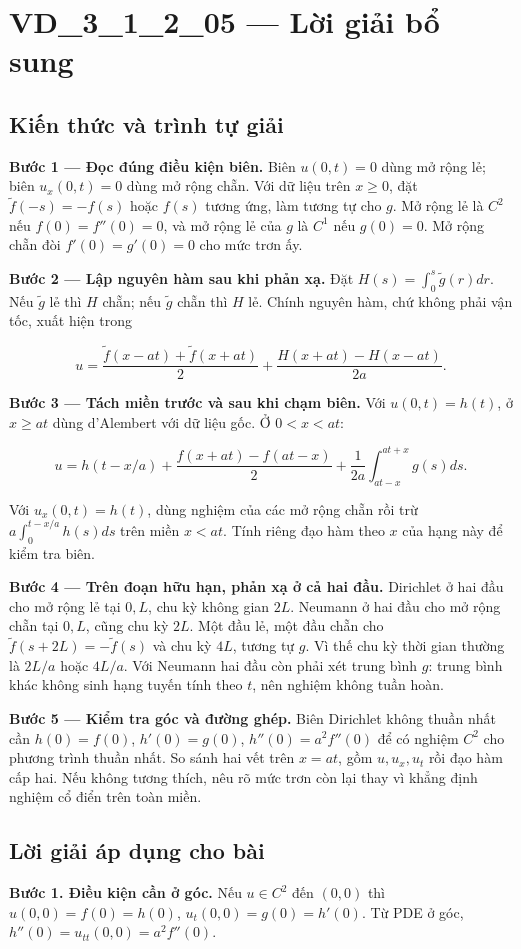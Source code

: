\documentclass[10pt,a4paper]{article}
\begin{document}
\section*{VD\_3\_1\_2\_05 — Lời giải bổ sung}
\subsection*{Kiến thức và trình tự giải}
\textbf{Bước 1 — Đọc đúng điều kiện biên.} Biên $u(0,t)=0$ dùng mở rộng lẻ; biên $u_x(0,t)=0$ dùng mở rộng chẵn. Với dữ liệu trên $x\ge0$, đặt $\widetilde f(-s)=-f(s)$ hoặc $f(s)$ tương ứng, làm tương tự cho $g$. Mở rộng lẻ là $C^2$ nếu $f(0)=f''(0)=0$, và mở rộng lẻ của $g$ là $C^1$ nếu $g(0)=0$. Mở rộng chẵn đòi $f'(0)=g'(0)=0$ cho mức trơn ấy.

\textbf{Bước 2 — Lập nguyên hàm sau khi phản xạ.} Đặt $H(s)=\int_0^s\widetilde g(r)dr$. Nếu $\widetilde g$ lẻ thì $H$ chẵn; nếu $\widetilde g$ chẵn thì $H$ lẻ. Chính nguyên hàm, chứ không phải vận tốc, xuất hiện trong


\[
u=\frac{\widetilde f(x-at)+\widetilde f(x+at)}2+\frac{H(x+at)-H(x-at)}{2a}.
\]


\textbf{Bước 3 — Tách miền trước và sau khi chạm biên.} Với $u(0,t)=h(t)$, ở $x\ge at$ dùng d'Alembert với dữ liệu gốc. Ở $0<x<at$:


\[
u=h(t-x/a)+\frac{f(x+at)-f(at-x)}2+\frac1{2a}\int_{at-x}^{at+x}g(s)ds.
\]


Với $u_x(0,t)=h(t)$, dùng nghiệm của các mở rộng chẵn rồi trừ $a\int_0^{t-x/a}h(s)ds$ trên miền $x<at$. Tính riêng đạo hàm theo $x$ của hạng này để kiểm tra biên.

\textbf{Bước 4 — Trên đoạn hữu hạn, phản xạ ở cả hai đầu.} Dirichlet ở hai đầu cho mở rộng lẻ tại $0,L$, chu kỳ không gian $2L$. Neumann ở hai đầu cho mở rộng chẵn tại $0,L$, cũng chu kỳ $2L$. Một đầu lẻ, một đầu chẵn cho $\widetilde f(s+2L)=-\widetilde f(s)$ và chu kỳ $4L$, tương tự $g$. Vì thế chu kỳ thời gian thường là $2L/a$ hoặc $4L/a$. Với Neumann hai đầu còn phải xét trung bình $g$: trung bình khác không sinh hạng tuyến tính theo $t$, nên nghiệm không tuần hoàn.

\textbf{Bước 5 — Kiểm tra góc và đường ghép.} Biên Dirichlet không thuần nhất cần $h(0)=f(0)$, $h'(0)=g(0)$, $h''(0)=a^2f''(0)$ để có nghiệm $C^2$ cho phương trình thuần nhất. So sánh hai vết trên $x=at$, gồm $u,u_x,u_t$ rồi đạo hàm cấp hai. Nếu không tương thích, nêu rõ mức trơn còn lại thay vì khẳng định nghiệm cổ điển trên toàn miền.
\subsection*{Lời giải áp dụng cho bài}
\textbf{Bước 1. Điều kiện cần ở góc.} Nếu $u\in C^2$ đến $(0,0)$ thì $u(0,0)=f(0)=h(0)$, $u_t(0,0)=g(0)=h'(0)$. Từ PDE ở góc, $h''(0)=u_{tt}(0,0)=a^2f''(0)$.
\end{document}
